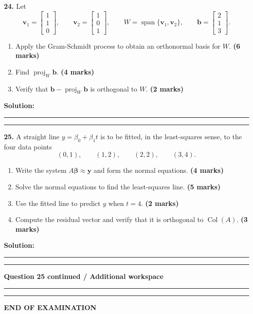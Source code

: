 \documentclass[11pt,a4paper]{article}
\newcommand{\answerbox}[1]{%
  \par\vspace{2mm}
  {\color{rulegray}\noindent\rule{\linewidth}{0.4pt}\par}
  \vspace{#1}
  {\color{rulegray}\noindent\rule{\linewidth}{0.4pt}\par}
}
\newcommand{\markpts}[1]{\hfill\textbf{(#1 marks)}}
\begin{document}
\newpage
\textbf{24.} Let
\[
\mathbf v_{1}=\begin{bmatrix}1\\1\\0\end{bmatrix},\qquad
\mathbf v_{2}=\begin{bmatrix}1\\0\\1\end{bmatrix},\qquad
W=\operatorname{span}\{\mathbf v_{1},\mathbf v_{2}\},\qquad
\mathbf b=\begin{bmatrix}2\\1\\3\end{bmatrix}.
\]
\begin{enumerate}[label=(\alph*),leftmargin=9mm]
  \item Apply the Gram-Schmidt process to obtain an orthonormal basis for $W$. \markpts{6}
  \item Find $\operatorname{proj}_{W}\mathbf b$. \markpts{4}
  \item Verify that $\mathbf b-\operatorname{proj}_{W}\mathbf b$ is orthogonal to $W$. \markpts{2}
\end{enumerate}

\textbf{Solution:}
\answerbox{120mm}

\newpage
\textbf{25.} A straight line $y=\beta_{0}+\beta_{1}t$ is to be fitted, in the
least-squares sense, to the four data points
\[
(0,1),\qquad(1,2),\qquad(2,2),\qquad(3,4).
\]
\begin{enumerate}[label=(\alph*),leftmargin=9mm]
  \item Write the system $A\boldsymbol\beta\approx\mathbf y$ and form the normal equations. \markpts{4}
  \item Solve the normal equations to find the least-squares line. \markpts{5}
  \item Use the fitted line to predict $y$ when $t=4$. \markpts{2}
  \item Compute the residual vector and verify that it is orthogonal to
        $\operatorname{Col}(A)$. \markpts{3}
\end{enumerate}

\textbf{Solution:}
\answerbox{50mm}

\newpage
{\color{examblue}\large\bfseries Question 25 continued / Additional workspace}

\vspace{4mm}
\answerbox{200mm}

\vfill
\begin{center}
  {\color{examblue}\Large\bfseries END OF EXAMINATION}
\end{center}
\end{document}
